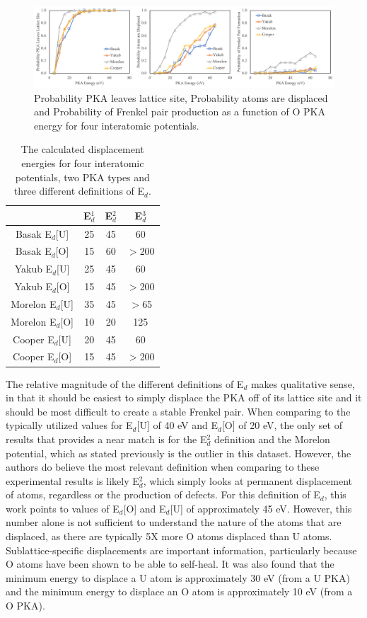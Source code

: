 \documentclass[review]{elsarticle}
\begin{document}
\begin{figure}[h]
 \centering
 \includegraphics[width=1.0\textwidth]{pot_compO.png}
 \caption{ Probability PKA leaves lattice site, Probability atoms are displaced and Probability of Frenkel pair production as a function of O PKA energy for four interatomic potentials. }
 \label{fig:pot_compO}
\end{figure}

\begin{table}[h]\label{tab:Ed}
	\center
	\caption{The calculated displacement energies for four interatomic potentials, two PKA types and three different definitions of E$_d$.}
	\begin{tabular}{|c|c|c|c|}
		\hline
	 & E$_d^1$ & E$_d^2$ & E$_d^3$ \\
	 \hline
	Basak E$_d$[U]	& 25 & 45 & 60 \\
	Basak E$_d$[O]	& 15 & 60 & $>$200 \\
	 \hline
 	Yakub E$_d$[U]	& 25 & 45 & 60 \\
	Yakub E$_d$[O]	& 15 & 45 & $>$200 \\
	 \hline
	Morelon E$_d$[U]	& 35 & 45 & $>$65 \\
	Morelon E$_d$[O]	& 10 & 20 & 125 \\
	 \hline
	Cooper E$_d$[U]	& 20 & 45 & 60 \\
	Cooper E$_d$[O]	& 15 & 45 & $>$200 \\
	 \hline
	\end{tabular}
\end{table}

The relative magnitude of the different definitions of E$_d$ makes qualitative sense, in that it should be easiest to simply displace the PKA off of its lattice site and it should be most difficult to create a stable Frenkel pair. When comparing to the typically utilized values for E$_d$[U] of 40 eV and E$_d$[O] of 20 eV, the only set of results that provides a near match is for the E$_d^2$ definition and the Morelon potential, which as stated previously is the outlier in this dataset. However, the authors do believe the most relevant definition when comparing to these experimental results is likely E$_d^2$, which simply looks at permanent displacement of atoms, regardless or the production of defects. For this definition of E$_d$, this work points to values of E$_d$[O] and E$_d$[U] of approximately 45 eV. However, this number alone is not sufficient to understand the nature of the atoms that are displaced, as there are typically 5X more O atoms displaced than U atoms. Sublattice-specific displacements are important information, particularly because O atoms have been shown to be able to self-heal. It was also found that the minimum energy to displace a U atom is approximately 30 eV (from a U PKA) and the minimum energy to displace an O atom is approximately 10 eV (from a O PKA).
\end{document}
